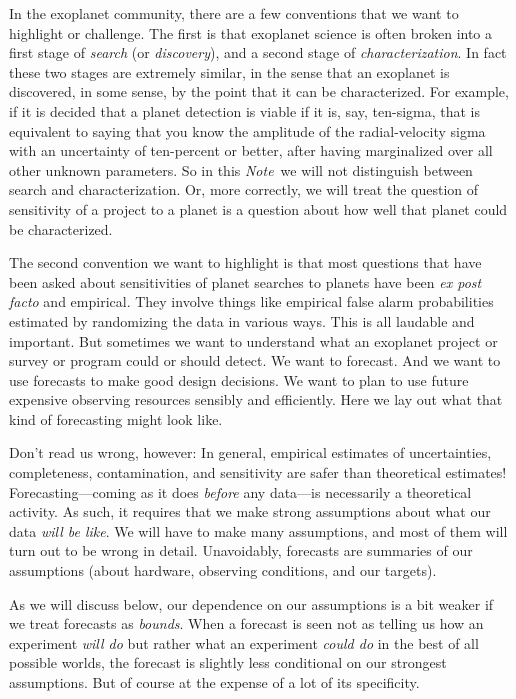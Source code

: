 \documentclass[10pt, letterpaper]{article}
\newcommand{\documentname}{\textsl{Note}}
\newcommand{\foreign}[1]{\textsl{#1}}
\newcounter{marginnote}
\renewcommand{\footnote}[1]{\refstepcounter{marginnote}\textsuperscript{\themarginnote}\marginpar{\color{darkgray}\raggedright\footnotesize\textsuperscript{\themarginnote}#1}}
\begin{document}
In the exoplanet community, there are a few conventions that we want
to highlight or challenge.
The first is that exoplanet science is often broken into a first stage
of \textsl{search} (or \textsl{discovery}), and a second stage of
\textsl{characterization}.
In fact these two stages are extremely similar, in the sense that an
exoplanet is discovered, in some sense, by the point that it can be
characterized.
For example, if it is decided that a planet detection is viable if it is,
say, ten-sigma, that is equivalent to saying that you know the amplitude
of the radial-velocity sigma with an uncertainty of ten-percent or better, 
after having marginalized over all other unknown parameters.
So in this \documentname\ we will not distinguish between search and
characterization.
Or, more correctly, we will treat the question of sensitivity of a
project to a planet is a question about how well that planet could be
characterized. 

The second convention we want to highlight is that most questions that
have been asked about sensitivities of planet searches to planets have
been \foreign{ex post facto} and empirical.
They involve things like empirical false alarm
probabilities\footnote{MB WHAT TO CITE?}  estimated by randomizing the
data in various ways.
This is all laudable and important.
But sometimes we want to understand what an exoplanet project or survey
or program could or should detect. We want to forecast. And we want to use
forecasts to make good design decisions. We want to plan to use future
expensive observing resources sensibly and efficiently.
Here we lay out what that kind of forecasting might look like.

Don't read us wrong, however: In general, empirical estimates of
uncertainties, completeness, contamination, and sensitivity are safer
than theoretical estimates!
Forecasting---coming as it does \emph{before} any data---is necessarily
a theoretical activity.
As such, it requires that we make strong assumptions about what our data
\emph{will be like}.
We will have to make many assumptions, and most of them will turn out to
be wrong in detail.
Unavoidably, forecasts are summaries of our assumptions (about hardware,
observing conditions, and our targets).

As we will discuss below, our dependence on our assumptions is a bit weaker
if we treat forecasts as \emph{bounds}. When a forecast is seen not as telling
us how an experiment \emph{will do} but rather what an experiment \emph{could do}
in the best of all possible worlds, the forecast is slightly less conditional
on our strongest assumptions. But of course at the  expense of a lot of
its specificity.
\end{document}
